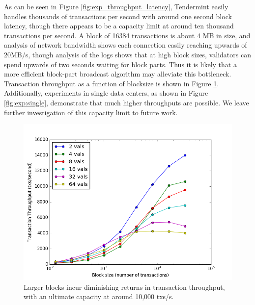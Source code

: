 As can be seen in Figure \ref{fig:exp_throughput_latency}, 
Tendermint easily handles thousands of transactions per second with around one second block latency,
though there appears to be a capacity limit at around ten thousand transactions per second.
A block of 16384 transactions is about 4 MB in size, and analysis of network bandwidth shows each connection
easily reaching upwards of 20MB/s, though analysis of the logs shows that at high block sizes, 
validators can spend upwards of two seconds waiting for block parts.
Thus it is likely that a more efficient block-part broadcast algorithm may alleviate this bottleneck.
Transaction throughput as a function of blocksize is shown in Figure \ref{fig:exp:throughput_blocksize}.
Additionally, experiments in single data centers, as shown in Figure \ref{fig:exp:single},
demonstrate that much higher throughputs are possible. We leave further investigation of this capacity limit to future work.


\begin{figure}[]
	\includegraphics[width=\linewidth,height=\textheight,keepaspectratio]{figures/throughput/throughput-blocksize.png}
    	\centering
	\caption[Throughput-blocksize in non-faulty network]{Larger blocks incur diminishing returns in transaction throughput, with an ultimate capacity at around 10,000 txs/s.}
	\label{fig:exp:throughput_blocksize}
\end{figure}

